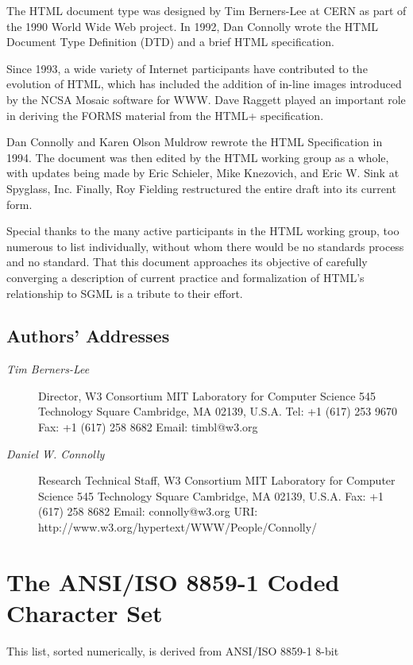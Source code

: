 The HTML document type was designed by Tim Berners-Lee at CERN as
part of the 1990 World Wide Web project.  In 1992, Dan Connolly wrote
the HTML Document Type Definition (DTD) and a brief HTML
specification.
\par \par 
Since 1993, a wide variety of Internet participants have
contributed to the evolution of HTML, which has included the addition
of in-line images introduced by the NCSA Mosaic software for WWW.  Dave
Raggett played an important role in deriving the FORMS material from
the HTML+ specification.
\par \par 
Dan Connolly and Karen Olson Muldrow rewrote the HTML Specification
in 1994.  The document was then edited by the HTML working group as a
whole, with updates being made by Eric Schieler, Mike Knezovich, and
Eric W.  Sink at Spyglass, Inc.  Finally, Roy Fielding restructured the
entire draft into its current form.
\par \par 
Special thanks to the many active participants in the HTML working
group, too numerous to list individually, without whom there would be
no standards process and no standard.  That this document approaches
its objective of carefully converging a description of current
practice and formalization of HTML's relationship to SGML is a tribute
to their effort.
\par \subsection*{Authors' Addresses}\begin{description}\item[{\it Tim Berners-Lee}]Director, W3 Consortium
MIT Laboratory for Computer Science
545 Technology Square
Cambridge, MA 02139, U.S.A.
Tel: +1 (617) 253 9670
Fax: +1 (617) 258 8682
Email: timbl@w3.org
\item[{\it Daniel W.  Connolly}]Research Technical Staff, W3 Consortium
MIT Laboratory for Computer Science
545 Technology Square
Cambridge, MA 02139, U.S.A.
Fax: +1 (617) 258 8682
Email: connolly@w3.org
URI: http://www.w3.org/hypertext/WWW/People/Connolly/
\end{description}\section*{The ANSI/ISO 8859-1 Coded Character Set}\par 
This list, sorted numerically, is derived from ANSI/ISO 8859-1 8-bit
